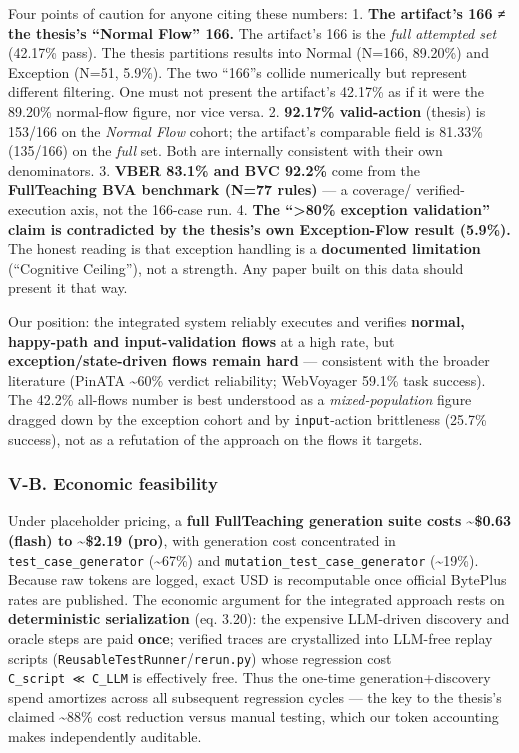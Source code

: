 \documentclass[
]{article}
\begin{document}
Four points of caution for anyone citing these numbers: 1. \textbf{The
artifact's 166 ≠ the thesis's ``Normal Flow'' 166.} The artifact's 166
is the \emph{full attempted set} (42.17\% pass). The thesis partitions
results into Normal (N=166, 89.20\%) and Exception (N=51, 5.9\%). The
two ``166''s collide numerically but represent different filtering. One
must not present the artifact's 42.17\% as if it were the 89.20\%
normal-flow figure, nor vice versa. 2. \textbf{92.17\% valid-action}
(thesis) is 153/166 on the \emph{Normal Flow} cohort; the artifact's
comparable field is 81.33\% (135/166) on the \emph{full} set. Both are
internally consistent with their own denominators. 3. \textbf{VBER
83.1\% and BVC 92.2\%} come from the \textbf{FullTeaching BVA benchmark
(N=77 rules)} --- a coverage/ verified-execution axis, not the 166-case
run. 4. \textbf{The ``\textgreater80\% exception validation'' claim is
contradicted by the thesis's own Exception-Flow result (5.9\%).} The
honest reading is that exception handling is a \textbf{documented
limitation} (``Cognitive Ceiling''), not a strength. Any paper built on
this data should present it that way.

Our position: the integrated system reliably executes and verifies
\textbf{normal, happy-path and input-validation flows} at a high rate,
but \textbf{exception/state-driven flows remain hard} --- consistent
with the broader literature (PinATA \textasciitilde60\% verdict
reliability; WebVoyager 59.1\% task success). The 42.2\% all-flows
number is best understood as a \emph{mixed-population} figure dragged
down by the exception cohort and by \texttt{input}-action brittleness
(25.7\% success), not as a refutation of the approach on the flows it
targets.

\subsubsection{V-B. Economic
feasibility}\label{v-b.-economic-feasibility}

Under placeholder pricing, a \textbf{full FullTeaching generation suite
costs \textasciitilde\$0.63 (flash) to \textasciitilde\$2.19 (pro)},
with generation cost concentrated in \texttt{test\_case\_generator}
(\textasciitilde67\%) and \texttt{mutation\_test\_case\_generator}
(\textasciitilde19\%). Because raw tokens are logged, exact USD is
recomputable once official BytePlus rates are published. The economic
argument for the integrated approach rests on \textbf{deterministic
serialization} (eq. 3.20): the expensive LLM-driven discovery and oracle
steps are paid \textbf{once}; verified traces are crystallized into
LLM-free replay scripts (\texttt{ReusableTestRunner}/\texttt{rerun.py})
whose regression cost \texttt{C\_script\ ≪\ C\_LLM} is effectively free.
Thus the one-time generation+discovery spend amortizes across all
subsequent regression cycles --- the key to the thesis's claimed
\textasciitilde88\% cost reduction versus manual testing, which our
token accounting makes independently auditable.
\end{document}
